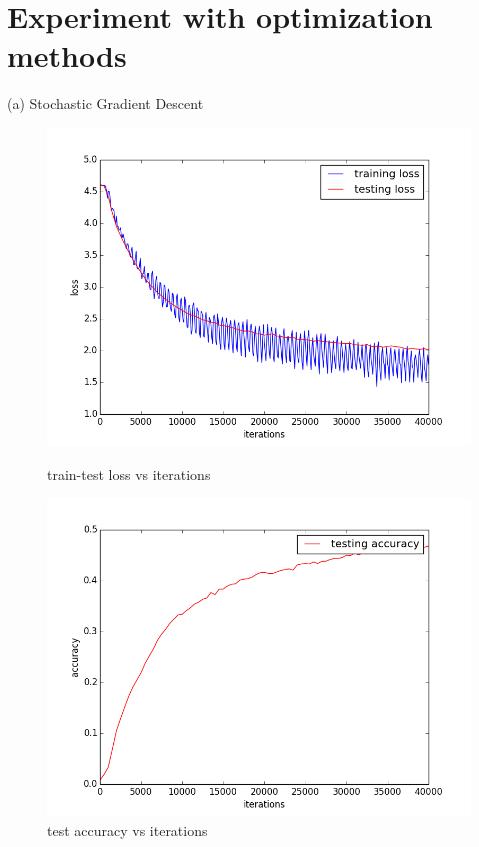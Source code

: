 \documentclass{article} %
\begin{document}
\section{Experiment with optimization methods}
(a) Stochastic Gradient Descent
\begin{figure}[H]
    \begin{minipage}{0.5\linewidth}
        \centering
        \includegraphics[scale=0.35]{SGD_1.png}
        \caption{train-test loss vs iterations}
    \end{minipage}
    \begin{minipage}{0.5\linewidth}
        \centering
        \includegraphics[scale=0.35]{SGD_2.png}
     \caption{test accuracy vs iterations}
    \end{minipage}
\end{figure}
\end{document}
